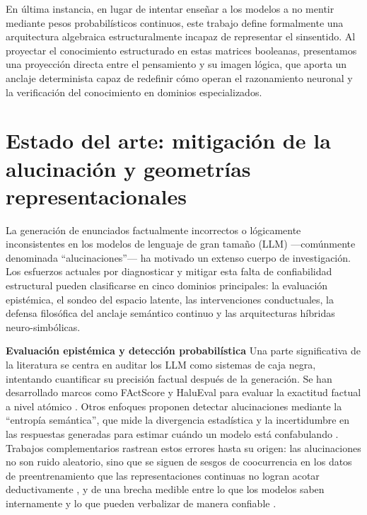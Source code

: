 \documentclass{article}
\begin{document}
En última instancia, en lugar de intentar enseñar a los modelos a no
mentir mediante pesos probabilísticos continuos, este trabajo define
formalmente una arquitectura algebraica estructuralmente incapaz de
representar el sinsentido. Al proyectar el conocimiento estructurado en
estas matrices booleanas, presentamos una proyección directa entre el
pensamiento y su imagen lógica, que aporta un anclaje determinista capaz
de redefinir cómo operan el razonamiento neuronal y la verificación del
conocimiento en dominios especializados.

\hypertarget{estado-del-arte-mitigaciuxf3n-de-la-alucinaciuxf3n-y-geometruxedas-representacionales}{%
\section{Estado del arte: mitigación de la alucinación y geometrías
representacionales}\label{estado-del-arte-mitigaciuxf3n-de-la-alucinaciuxf3n-y-geometruxedas-representacionales}}

La generación de enunciados factualmente incorrectos o lógicamente
inconsistentes en los modelos de lenguaje de gran tamaño (LLM)
---comúnmente denominada ``alucinaciones''--- ha motivado un extenso
cuerpo de investigación. Los esfuerzos actuales por diagnosticar y
mitigar esta falta de confiabilidad estructural pueden clasificarse en
cinco dominios principales: la evaluación epistémica, el sondeo del
espacio latente, las intervenciones conductuales, la defensa filosófica
del anclaje semántico continuo y las arquitecturas híbridas
neuro-simbólicas.

\textbf{Evaluación epistémica y detección probabilística} Una parte
significativa de la literatura se centra en auditar los LLM como
sistemas de caja negra, intentando cuantificar su precisión factual
después de la generación. Se han desarrollado marcos como FActScore y
HaluEval para evaluar la exactitud factual a nivel atómico
\citep{factscore2023, halueval2023}. Otros enfoques proponen detectar
alucinaciones mediante la ``entropía semántica'', que mide la
divergencia estadística y la incertidumbre en las respuestas generadas
para estimar cuándo un modelo está confabulando
\citep{semantic_entropy2024}. Trabajos complementarios rastrean estos
errores hasta su origen: las alucinaciones no son ruido aleatorio, sino
que se siguen de sesgos de coocurrencia en los datos de preentrenamiento
que las representaciones continuas no logran acotar deductivamente
\citep{mckenna2023}, y de una brecha medible entre lo que los modelos
saben internamente y lo que pueden verbalizar de manera confiable
\citep{yin2023}.
\end{document}
